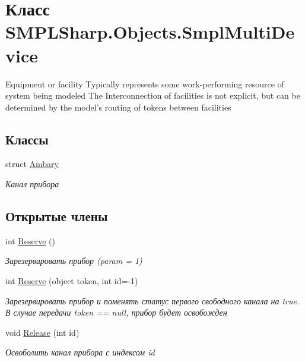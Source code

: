 \hypertarget{class_s_m_p_l_sharp_1_1_objects_1_1_smpl_multi_device}{\section{Класс S\-M\-P\-L\-Sharp.\-Objects.\-Smpl\-Multi\-Device}
\label{d8/d23/class_s_m_p_l_sharp_1_1_objects_1_1_smpl_multi_device}
}


Equipment or facility Typically represents some work-\/performing resource of system being modeled The Interconnection of facilities is not explicit, but can be determined by the model’s routing of tokens between facilities  


\subsection*{Классы}
\begin{DoxyCompactItemize}
\item 
struct \hyperlink{struct_s_m_p_l_sharp_1_1_objects_1_1_smpl_multi_device_1_1_ambary}{Ambary}
\begin{DoxyCompactList}\small\item\em Канал прибора \end{DoxyCompactList}\end{DoxyCompactItemize}
\subsection*{Открытые члены}
\begin{DoxyCompactItemize}
\item 
int \hyperlink{class_s_m_p_l_sharp_1_1_objects_1_1_smpl_multi_device_af58fc9219c338c818848574937481e16}{Reserve} ()
\begin{DoxyCompactList}\small\item\em Зарезервировать прибор (param = 1) \end{DoxyCompactList}\item 
int \hyperlink{class_s_m_p_l_sharp_1_1_objects_1_1_smpl_multi_device_a2749dda4f3731c1d9a5caf2e13448eea}{Reserve} (object token, int id=-\/1)
\begin{DoxyCompactList}\small\item\em Зарезервировать прибор и поменять статус первого свободного канала на true. В случае передачи token == null, прибор будет освобожден \end{DoxyCompactList}\item 
void \hyperlink{class_s_m_p_l_sharp_1_1_objects_1_1_smpl_multi_device_afcdb358ca4ae1e32c383a594cd8e10b1}{Release} (int id)
\begin{DoxyCompactList}\small\item\em Освоболить канал прибора с индексом id \end{DoxyCompactList}\end{DoxyCompactItemize}
